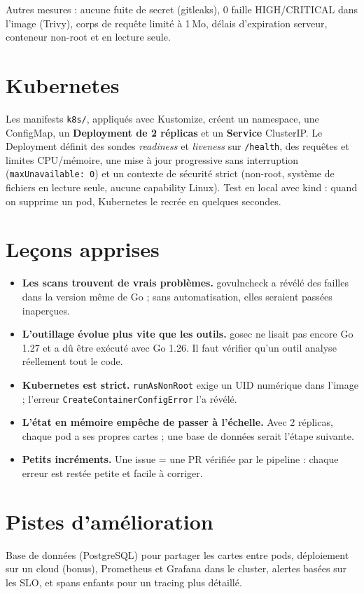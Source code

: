 \documentclass[11pt,a4paper]{article}
\newcommand{\code}[1]{\texttt{\small #1}}
\begin{document}
Autres mesures : aucune fuite de secret (gitleaks), 0 faille HIGH/CRITICAL dans l'image (Trivy), corps de requête
limité à 1\,Mo, délais d'expiration serveur, conteneur non-root et en lecture seule.

\section{Kubernetes}
Les manifests \code{k8s/}, appliqués avec Kustomize, créent un namespace, une ConfigMap, un \textbf{Deployment de
2 réplicas} et un \textbf{Service} ClusterIP. Le Deployment définit des sondes \emph{readiness} et \emph{liveness}
sur \code{/health}, des requêtes et limites CPU/mémoire, une mise à jour progressive sans interruption
(\code{maxUnavailable: 0}) et un contexte de sécurité strict (non-root, système de fichiers en lecture seule,
aucune capability Linux). Test en local avec kind : quand on supprime un pod, Kubernetes le recrée en quelques
secondes.

\section{Leçons apprises}
\begin{itemize}
  \item \textbf{Les scans trouvent de vrais problèmes.} govulncheck a révélé des failles dans la version même de
        Go ; sans automatisation, elles seraient passées inaperçues.
  \item \textbf{L'outillage évolue plus vite que les outils.} gosec ne lisait pas encore Go 1.27 et a dû être
        exécuté avec Go 1.26. Il faut vérifier qu'un outil analyse réellement tout le code.
  \item \textbf{Kubernetes est strict.} \code{runAsNonRoot} exige un UID numérique dans l'image ; l'erreur
        \code{Create\allowbreak Container\allowbreak Config\allowbreak Error} l'a révélé.
  \item \textbf{L'état en mémoire empêche de passer à l'échelle.} Avec 2 réplicas, chaque pod a ses propres
        cartes ; une base de données serait l'étape suivante.
  \item \textbf{Petits incréments.} Une issue = une PR vérifiée par le pipeline : chaque erreur est restée petite et
        facile à corriger.
\end{itemize}

\section{Pistes d'amélioration}
Base de données (PostgreSQL) pour partager les cartes entre pods, déploiement sur un cloud (bonus), Prometheus et
Grafana dans le cluster, alertes basées sur les SLO, et spans enfants pour un tracing plus détaillé.
\end{document}
